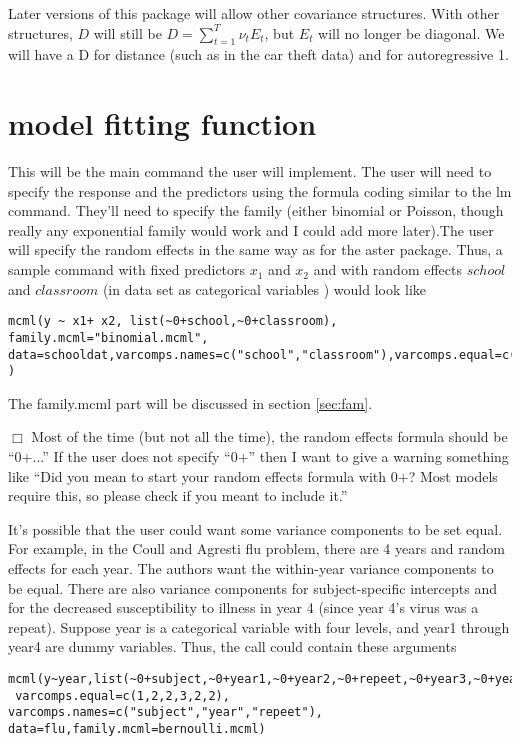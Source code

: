 \documentclass{article}
\begin{document}
 Later versions of this package will allow other covariance structures. With other structures, $D$ will still be $D= \sum_{t=1}^T \nu_t E_t$, but $E_t$ will no longer be diagonal. We will have a D for distance (such as in the car theft data) and for autoregressive 1.




\section{model fitting function} 
This will be the main command the user will implement. The user will need to specify the response and the predictors using the formula coding similar to the lm command.  They'll need to specify the  family (either binomial or Poisson, though  really any exponential family would work and I could add more later).The user will specify the random effects in the same way as for the aster package. Thus, a sample command with fixed predictors $x_1$ and $x_2$ and with random effects $school$ and $classroom$ (in data set as categorical variables ) would look like
\begin{verbatim}
mcml(y ~ x1+ x2, list(~0+school,~0+classroom),  family.mcml="binomial.mcml", data=schooldat,varcomps.names=c("school","classroom"),varcomps.equal=c(1,2) )
    \end{verbatim}
The family.mcml part will be discussed in section \ref{sec:fam}.   

$\Box$ Most of the time (but not all the time), the random effects formula should be ``0+...'' If the user does not specify ``0+'' then I want to give a warning something like ``Did you mean to start your random effects formula with 0+? Most models require this, so please check if you meant to include it.''

It's possible that the user could want some variance components to be set equal. For example, in the Coull and Agresti flu problem, there are 4 years and random effects for each year. The authors want the within-year variance components to be equal.  There are also variance components for subject-specific intercepts and for the decreased susceptibility to illness in year 4 (since year 4's virus was a repeat). Suppose year is a categorical variable with four levels, and year1 through year4 are dummy variables. Thus, the call could contain these arguments
\begin{verbatim}
mcml(y~year,list(~0+subject,~0+year1,~0+year2,~0+repeet,~0+year3,~0+year4),
 varcomps.equal=c(1,2,2,3,2,2), varcomps.names=c("subject","year","repeet"),
data=flu,family.mcml=bernoulli.mcml)
\end{verbatim}
\end{document}
